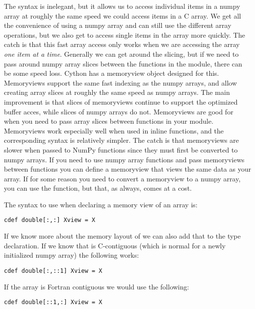 The syntax is inelegant, but it allows us to access individual items in a numpy array at roughly the same speed we could access items in a C array.
We get all the convenience of using a numpy array and can still use the different array operations, but we also get to access single items in the array more quickly.
The catch is that this fast array access only works when we are accessing the array \textit{one item at a time}.
Generally we can get around the slicing, but if we need to pass around numpy array slices between the functions in the module, there can be some speed loss.
Cython has a memoryview object designed for this.
Memoryviews support the same fast indexing as the numpy arrays, and allow creating array slices at roughly the same speed as numpy arrays.
The main improvement is that slices of memoryviews continue to support the optimized buffer acces, while slices of numpy arrays do not.
Memoryviews are good for when you need to pass array slices between functions in your module.
Memoryviews work especially well when used in inline functions, and the corresponding syntax is relatively simpler.
The catch is that memoryviews are slower when passed to NumPy functions since they must first be converted to numpy arrays.
If you need to use numpy array functions and pass memoryviews between functions you can define a memoryview that views the same data as your array.
If for some reason you need to convert a memoryview to a numpy array, you can use the  function, but that, as always, comes at a cost.

The syntax to use when declaring a memory view of an array  is:
\begin{lstlisting}
cdef double[:,:] Xview = X
\end{lstlisting}

If we know more about the memory layout of  we can also add that to the type declaration.
If we know that  is C-contiguous (which is normal for a newly initialized numpy array) the following works:

\begin{lstlisting}
cdef double[:,::1] Xview = X
\end{lstlisting}

If the array is Fortran contiguous we would use the following:

\begin{lstlisting}
cdef double[::1,:] Xview = X
\end{lstlisting}

